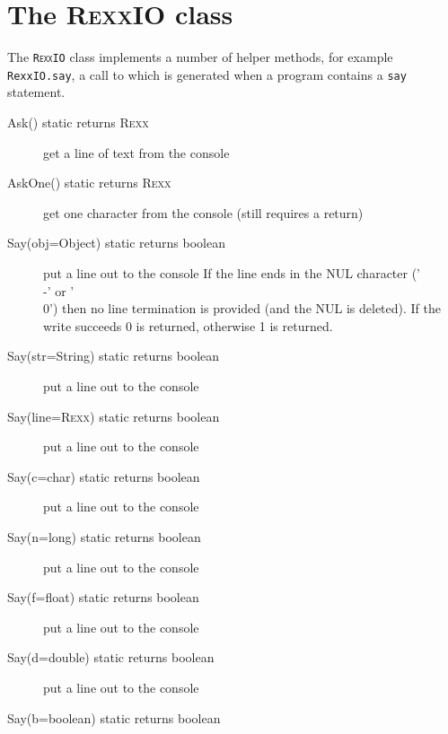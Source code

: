 \section{The R\textsc{exx}IO class}\label{refrexxio}
 
The \texttt{R\textsc{exx}IO} class implements a number of helper methods, for example \texttt{RexxIO.say}, a call to which is generated when a program contains a \texttt{say} statement. 

\begin{description}
  \item[Ask() static returns R\textsc{exx}]

get a line of text from the console
  \item [AskOne() static returns R\textsc{exx}]

get one character from the console (still requires a return)
 \item[Say(obj=Object) static returns boolean]

put a line out to the console
    If the line ends in the NUL character ('\\-' or '\\0') then no
    line termination is provided (and the NUL is deleted).
    If the write succeeds 0 is returned, otherwise 1 is returned.
 
  \item[Say(str=String) static returns boolean]

put a line out to the console
  \item[Say(line=R\textsc{exx}) static returns boolean]

put a line out to the console
  \item[Say(c=char) static returns boolean]

put a line out to the console
  \item[Say(n=long) static returns boolean]

put a line out to the console
  \item[Say(f=float)   static returns boolean]

put a line out to the console
  \item[Say(d=double)  static returns boolean]

put a line out to the console
  \item[Say(b=boolean) static returns boolean]


\end{description}
